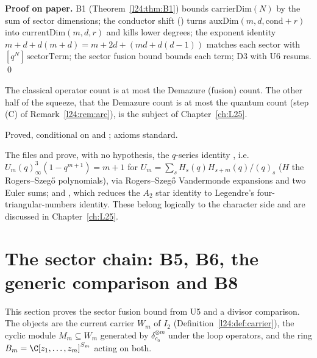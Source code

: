 \textbf{Proof on paper.} B1 (Theorem~\ref{l24:thm:B1}) bounds $\mathrm{carrierDim}(N)$ by the sum of sector dimensions;
the conductor shift () turns $\mathrm{auxDim}(m,d,\mathrm{cond}+r)$ into $\mathrm{currentDim}(m,d,r)$
and kills lower degrees; the exponent identity $m+d+d(m+d)=m+2d+(md+d(d-1))$ matches each sector with
$[q^N]\,\mathrm{sectorTerm}$; the sector fusion bound bounds each term; D3 with U6 resums. \qed

\begin{physics}
The classical operator count is at most the Demazure (fusion) count. The other half of the squeeze, that the Demazure count
is at most the quantum count (step (C) of Remark~\ref{l24:rem:arc}), is the subject of Chapter~\ref{ch:L25}.
\end{physics}

\begin{status}
Proved, conditional on  and ; axioms standard.
\end{status}

\begin{remark}\label{l24:rem:mehler}
The files  and  prove, with no hypothesis, the
$q$-series identity , i.e.\ $U_m(q)_\infty^3(1-q^{m+1})=m+1$ for
$U_m=\sum_sH_s(q)H_{s+m}(q)/(q)_s$ ($H$ the Rogers--Szeg\H{o} polynomials), via Rogers--Szeg\H{o} Vandermonde
expansions and two Euler sums; and , which reduces the $A_2$ star identity
to Legendre's four-triangular-numbers identity. These belong logically to the character side and are discussed
in Chapter~\ref{ch:L25}.
\end{remark}

\section{The sector chain: B5, B6, the generic comparison and B8}\label{l24:sec:sector}

This section proves the sector fusion bound from U5 and a divisor comparison. The objects are the current
carrier $W_m$ of $I_2$ (Definition~\ref{l24:def:carrier}), the cyclic module $M_m\subseteq W_m$ generated by
$\delta_{c_0}^{\otimes m}$ under the loop operators, and the ring $B_m=\C[z_1,\dots,z_m]^{S_m}$ acting on both.

